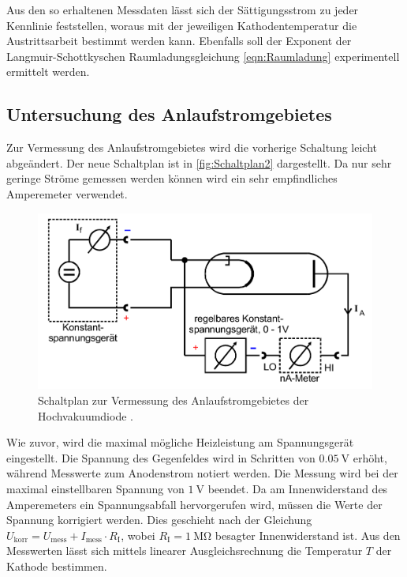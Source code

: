 Aus den so erhaltenen Messdaten lässt sich der Sättigungsstrom zu jeder Kennlinie feststellen, woraus mit der jeweiligen Kathodentemperatur die Austrittsarbeit bestimmt werden kann.
Ebenfalls soll der Exponent der Langmuir-Schottkyschen Raumladungsgleichung \ref{eqn:Raumladung} experimentell ermittelt werden.

\subsection{Untersuchung des Anlaufstromgebietes}
\label{subsec:D_Anlaufstrom}
Zur Vermessung des Anlaufstromgebietes wird die vorherige Schaltung leicht abgeändert. Der neue Schaltplan ist in \autoref{fig:Schaltplan2} dargestellt. 
Da nur sehr geringe Ströme gemessen werden können wird ein sehr empfindliches Amperemeter verwendet.

\begin{figure}
    \centering
    \includegraphics[width = .6\textwidth]{content/Schaltplan2.png}
    \caption{Schaltplan zur Vermessung des Anlaufstromgebietes der Hochvakuumdiode \cite{v504}.}
    \label{fig:Schaltplan2}
\end{figure}

Wie zuvor, wird die maximal mögliche Heizleistung am Spannungsgerät eingestellt. Die Spannung des Gegenfeldes wird in Schritten von $\qty{0.05}{\volt}$ erhöht, während Messwerte
zum Anodenstrom notiert werden. Die Messung wird bei der maximal einstellbaren Spannung von $\qty{1}{\volt}$ beendet.
Da am Innenwiderstand des Amperemeters ein Spannungsabfall hervorgerufen wird, müssen die Werte der Spannung korrigiert werden. 
Dies geschieht nach der Gleichung $U_\text{korr} = U_\text{mess} + I_\text{mess} \cdot R_\text{I}$, wobei $R_\text{I} = \qty{1}{\mega\ohm}$ besagter Innenwiderstand ist.
Aus den Messwerten lässt sich mittels linearer Ausgleichsrechnung die Temperatur $T$ der Kathode bestimmen. 
